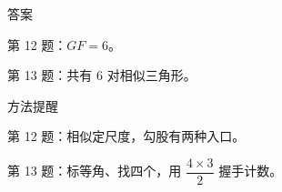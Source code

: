 \documentclass{exam-zh}
\begin{document}
\begin{eduBottomGrid}
  \begin{eduSummaryLeft}
    \begin{eduSummaryBlock}{\eduIconCheck}{答案}
    \begin{eduPlainList}
      \item 第 12 题：$GF=6$。      \item 第 13 题：共有 $6$ 对相似三角形。    \end{eduPlainList}
    \end{eduSummaryBlock}
  \end{eduSummaryLeft}
  \eduSummaryDivider
  \begin{eduSummaryRight}
    \begin{eduSummaryBlock}{\eduIconPin}{方法提醒}
    \begin{eduBulletList}
      \item 第 12 题：相似定尺度，勾股有两种入口。      \item 第 13 题：标等角、找四个，用 $\dfrac{4\times3}{2}$ 握手计数。    \end{eduBulletList}
    \end{eduSummaryBlock}
  \end{eduSummaryRight}
\end{eduBottomGrid}
\end{document}
